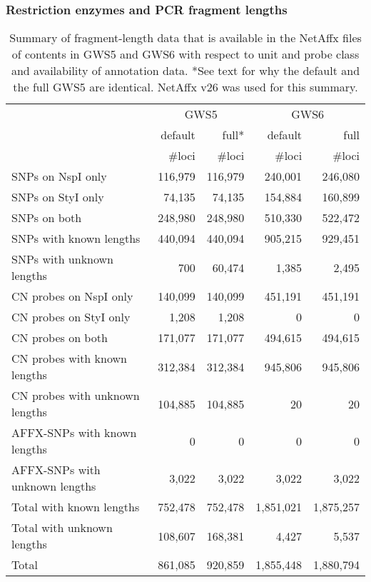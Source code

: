 \documentclass[10pt,a4paper]{article}
\newcommand{\GWSFive}{GWS5\xspace}
\newcommand{\GWSSix}{GWS6\xspace}
\begin{document}
\subsubsection{Restriction enzymes and PCR fragment lengths}
\begin{table}[hp]
\begin{center}
\begin{tabular}{|l||rr||rr|}
\hline
     & \multicolumn{2}{c||}{\GWSFive} & \multicolumn{2}{c|}{\GWSSix} \\
     & default & full* & default & full \\
     & \#loci & \#loci & \#loci & \#loci \\
\hline
\hline
SNPs on NspI only        & 116,979 &  116,979  &   240,001 &   246,080 \\
SNPs on StyI only        &  74,135 &   74,135  &   154,884 &   160,899 \\
SNPs on both             & 248,980 &  248,980  &   510,330 &   522,472 \\
\hline
SNPs with known lengths  & 440,094 &  440,094  &   905,215 &   929,451 \\
SNPs with unknown lengths&     700 &   60,474  &     1,385 &     2,495 \\
\hline
\hline
CN probes on NspI only   & 140,099 &  140,099  &   451,191 &   451,191 \\
CN probes on StyI only   &   1,208 &    1,208  &         0 &         0 \\
CN probes on both        & 171,077 &  171,077  &   494,615 &   494,615 \\
\hline
CN probes with known lengths   & 312,384 &  312,384  &   945,806 &   945,806 \\
CN probes with unknown lengths & 104,885 &  104,885  &        20 &        20 \\
\hline
\hline
AFFX-SNPs with known lengths   &       0 &        0  &         0 &         0 \\
AFFX-SNPs with unknown lengths &   3,022 &    3,022  &     3,022 &     3,022 \\
\hline
\hline
Total with known lengths       & 752,478 &  752,478  & 1,851,021 & 1,875,257 \\
Total with unknown lengths     & 108,607 &  168,381  &     4,427 &     5,537 \\
\hline
Total                          & 861,085 &  920,859  & 1,855,448 & 1,880,794 \\
\hline
\end{tabular}
\end{center}
\caption{Summary of fragment-length data that is available in the NetAffx files of contents in GWS5 and GWS6 with respect to unit and probe class and availability of annotation data.  *See text for why the default and the full GWS5 are identical.  NetAffx v26 was used for this summary.}
\label{tblFragmentLengths}
\end{table}
\end{document}
